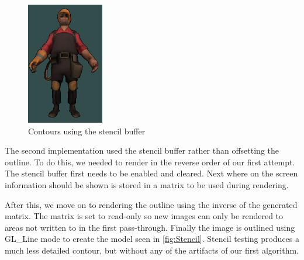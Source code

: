 \begin{figure}[h]
    \centering
    \includegraphics[width=0.3\textwidth]{img/ModelD.png}
    \caption{Contours using the stencil buffer}
    \label{fig:Stencil}
\end{figure}

The second implementation used the stencil buffer rather than offsetting the outline. To do this, we needed to render in the reverse order of our first attempt. The stencil buffer first needs to be enabled and cleared. Next where on the screen information should be shown is stored in a matrix to be used during rendering. 
 
After this, we move on to rendering the outline using the inverse of the generated matrix. The matrix is
set to read-only so new images can only be rendered to areas not written to in the first pass-through.
Finally the image is outlined using GL\_Line mode to create the model seen in \autoref{fig:Stencil}. Stencil testing 
produces a much less detailed contour, but without any of the artifacts of our first algorithm.

\newpage
{}

